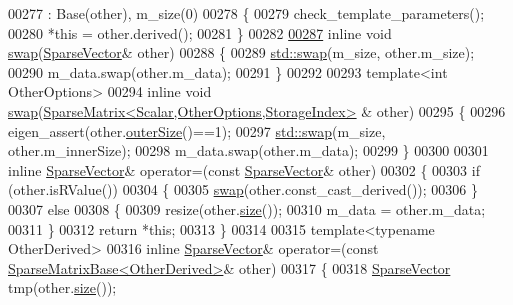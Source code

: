\begin{DoxyCode}
00277       : Base(other), m\_size(0)
00278     \{
00279       check\_template\_parameters();
00280       *\textcolor{keyword}{this} = other.derived();
00281     \}
00282 
\hyperlink{group___sparse_core___module_a977f1796d4b332a0827c5a1d7b1ed561}{00287}     \textcolor{keyword}{inline} \textcolor{keywordtype}{void} \hyperlink{group___sparse_core___module_a977f1796d4b332a0827c5a1d7b1ed561}{swap}(\hyperlink{group___sparse_core___module_class_eigen_1_1_sparse_vector}{SparseVector}& other)
00288     \{
00289       \hyperlink{endian_8c_a3ca5ecd34b04d6a243c054ac3a57f68d}{std::swap}(m\_size, other.m\_size);
00290       m\_data.swap(other.m\_data);
00291     \}
00292 
00293     \textcolor{keyword}{template}<\textcolor{keywordtype}{int} OtherOptions>
00294     \textcolor{keyword}{inline} \textcolor{keywordtype}{void} \hyperlink{endian_8c_a3ca5ecd34b04d6a243c054ac3a57f68d}{swap}(\hyperlink{group___sparse_core___module_class_eigen_1_1_sparse_matrix}{SparseMatrix<Scalar,OtherOptions,StorageIndex>}
      & other)
00295     \{
00296       eigen\_assert(other.\hyperlink{group___sparse_core___module_a4e5f706cfae14d2eaec1ea1e234905f1}{outerSize}()==1);
00297       \hyperlink{endian_8c_a3ca5ecd34b04d6a243c054ac3a57f68d}{std::swap}(m\_size, other.m\_innerSize);
00298       m\_data.swap(other.m\_data);
00299     \}
00300 
00301     \textcolor{keyword}{inline} \hyperlink{group___sparse_core___module_class_eigen_1_1_sparse_vector}{SparseVector}& operator=(\textcolor{keyword}{const} \hyperlink{group___sparse_core___module_class_eigen_1_1_sparse_vector}{SparseVector}& other)
00302     \{
00303       \textcolor{keywordflow}{if} (other.isRValue())
00304       \{
00305         \hyperlink{endian_8c_a3ca5ecd34b04d6a243c054ac3a57f68d}{swap}(other.const\_cast\_derived());
00306       \}
00307       \textcolor{keywordflow}{else}
00308       \{
00309         resize(other.\hyperlink{group___sparse_core___module_a124bc57921775eb9aa2dfd9727e23472}{size}());
00310         m\_data = other.m\_data;
00311       \}
00312       \textcolor{keywordflow}{return} *\textcolor{keyword}{this};
00313     \}
00314 
00315     \textcolor{keyword}{template}<\textcolor{keyword}{typename} OtherDerived>
00316     \textcolor{keyword}{inline} \hyperlink{group___sparse_core___module_class_eigen_1_1_sparse_vector}{SparseVector}& operator=(\textcolor{keyword}{const} 
      \hyperlink{group___sparse_core___module_class_eigen_1_1_sparse_matrix_base}{SparseMatrixBase<OtherDerived>}& other)
00317     \{
00318       \hyperlink{group___sparse_core___module_class_eigen_1_1_sparse_vector}{SparseVector} tmp(other.\hyperlink{group___sparse_core___module_a124bc57921775eb9aa2dfd9727e23472}{size}());

\end{DoxyCode}
